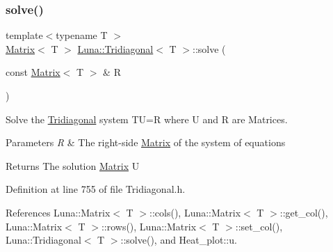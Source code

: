 \subsubsection{\texorpdfstring{solve()}{solve()}\hspace{0.1cm}{\footnotesize\ttfamily [2/2]}}
{\footnotesize\ttfamily template$<$typename T $>$ \\
\hyperlink{classLuna_1_1Matrix}{Matrix}$<$ T $>$ \hyperlink{classLuna_1_1Tridiagonal}{Luna\+::\+Tridiagonal}$<$ T $>$\+::solve (\begin{DoxyParamCaption}\item[{const \hyperlink{classLuna_1_1Matrix}{Matrix}$<$ T $>$ \&}]{R }\end{DoxyParamCaption})\hspace{0.3cm}{\ttfamily [inline]}}



Solve the \hyperlink{classLuna_1_1Tridiagonal}{Tridiagonal} system TU=R where U and R are Matrices. 


\begin{DoxyParams}{Parameters}
{\em R} & The right-\/side \hyperlink{classLuna_1_1Matrix}{Matrix} of the system of equations \\
\hline
\end{DoxyParams}
\begin{DoxyReturn}{Returns}
The solution \hyperlink{classLuna_1_1Matrix}{Matrix} U 
\end{DoxyReturn}


Definition at line 755 of file Tridiagonal.\+h.



References Luna\+::\+Matrix$<$ T $>$\+::cols(), Luna\+::\+Matrix$<$ T $>$\+::get\+\_\+col(), Luna\+::\+Matrix$<$ T $>$\+::rows(), Luna\+::\+Matrix$<$ T $>$\+::set\+\_\+col(), Luna\+::\+Tridiagonal$<$ T $>$\+::solve(), and Heat\+\_\+plot\+::u.


